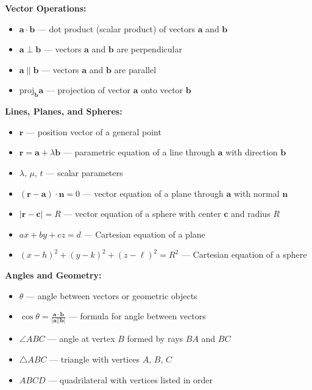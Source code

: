 \documentclass[12pt]{article}
\begin{document}
\vspace{0.3em}
\noindent\textbf{Vector Operations:}
\begin{itemize}[leftmargin=*]
  \item $\mathbf{a} \cdot \mathbf{b}$ --- dot product (scalar product) of vectors $\mathbf{a}$ and $\mathbf{b}$
  \item $\mathbf{a} \perp \mathbf{b}$ --- vectors $\mathbf{a}$ and $\mathbf{b}$ are perpendicular
  \item $\mathbf{a} \parallel \mathbf{b}$ --- vectors $\mathbf{a}$ and $\mathbf{b}$ are parallel
  \item $\text{proj}_{\mathbf{b}}\mathbf{a}$ --- projection of vector $\mathbf{a}$ onto vector $\mathbf{b}$
\end{itemize}

\vspace{0.3em}
\noindent\textbf{Lines, Planes, and Spheres:}
\begin{itemize}[leftmargin=*]
  \item $\mathbf{r}$ --- position vector of a general point
  \item $\mathbf{r} = \mathbf{a} + \lambda\mathbf{b}$ --- parametric equation of a line through $\mathbf{a}$ with direction $\mathbf{b}$
  \item $\lambda$, $\mu$, $t$ --- scalar parameters
  \item $(\mathbf{r} - \mathbf{a}) \cdot \mathbf{n} = 0$ --- vector equation of a plane through $\mathbf{a}$ with normal $\mathbf{n}$
  \item $|\mathbf{r} - \mathbf{c}| = R$ --- vector equation of a sphere with center $\mathbf{c}$ and radius $R$
  \item $ax + by + cz = d$ --- Cartesian equation of a plane
  \item $(x-h)^2 + (y-k)^2 + (z-\ell)^2 = R^2$ --- Cartesian equation of a sphere
\end{itemize}

\vspace{0.3em}
\noindent\textbf{Angles and Geometry:}
\begin{itemize}[leftmargin=*]
  \item $\theta$ --- angle between vectors or geometric objects
  \item $\cos\theta = \frac{\mathbf{a} \cdot \mathbf{b}}{|\mathbf{a}||\mathbf{b}|}$ --- formula for angle between vectors
  \item $\angle ABC$ --- angle at vertex $B$ formed by rays $BA$ and $BC$
  \item $\triangle ABC$ --- triangle with vertices $A$, $B$, $C$
  \item $ABCD$ --- quadrilateral with vertices listed in order
\end{itemize}
\end{document}
